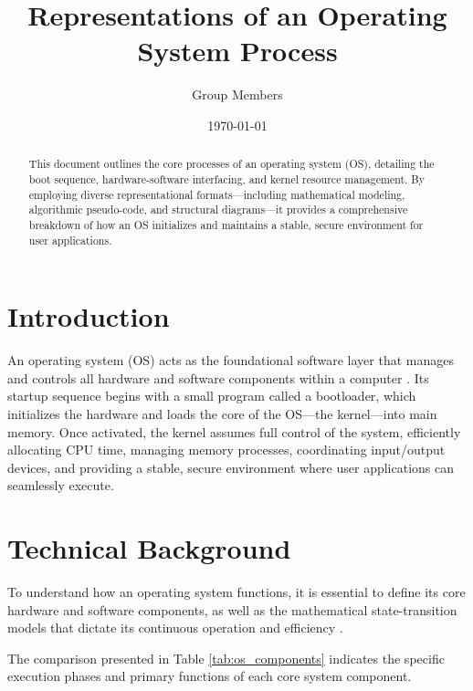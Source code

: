\documentclass[11pt, a4paper]{article}
\title{Representations of an Operating System Process}
\author{Group Members}
\date{\today}
\begin{document}
\maketitle

\begin{abstract}
This document outlines the core processes of an operating system (OS), detailing the boot sequence, hardware-software interfacing, and kernel resource management. By employing diverse representational formats---including mathematical modeling, algorithmic pseudo-code, and structural diagrams---it provides a comprehensive breakdown of how an OS initializes and maintains a stable, secure environment for user applications.
\end{abstract}

\section{Introduction}
An operating system (OS) acts as the foundational software layer that manages and controls all hardware and software components within a computer \cite{silberschatz}. Its startup sequence begins with a small program called a bootloader, which initializes the hardware and loads the core of the OS---the kernel---into main memory. \newline
\newline Once activated, the kernel assumes full control of the system, efficiently allocating CPU time, managing memory processes, coordinating input/output devices, and providing a stable, secure environment where user applications can seamlessly execute.

\section{Technical Background}
To understand how an operating system functions, it is essential to define its core hardware and software components, as well as the mathematical state-transition models that dictate its continuous operation and efficiency \cite{tanenbaum}.

The comparison presented in Table \ref{tab:os_components} indicates the specific execution phases and primary functions of each core system component.
\end{document}
